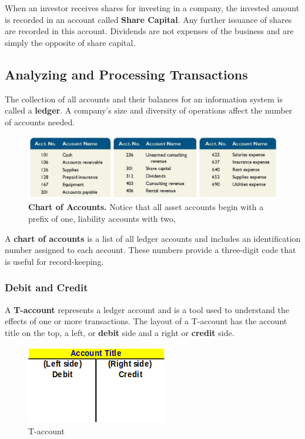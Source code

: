 \documentclass[../main.tex]{subfiles}
\begin{document}
	When an investor receives shares for investing in a company, 
	the invested amount is recorded in an account called \textbf{Share 
	Capital}.  Any further issuance of shares are recorded in this account. 
	Dividends are not expenses of the business and are simply the opposite of 
	share capital. 
	
	\subsection{Analyzing and Processing Transactions}
	
	The collection of all accounts and their balances for an information system 
	is called a \textbf{ledger}. A company's size and diversity of operations 
	affect the number of accounts needed.  
	
	\begin{figure}[ht]
		\centering
		\includegraphics[width=1\columnwidth]{images/c2/chart_of_accounts.png}
		\caption{\textbf{Chart of Accounts.} Notice that all asset accounts 
		begin with a 
		prefix of one, liability accounts with two, \etc}
	\end{figure}
	
	A \textbf{chart of accounts} is a 
	list of all ledger accounts and includes an identification number assigned 
	to each account. These numbers provide a three-digit code that is useful 
	for record-keeping. 
	
	\subsubsection{Debit and Credit}
	
	A \textbf{T-account} represents a ledger account and is a tool used to 
	understand the effects of one or more transactions. The layout of a 
	T-account has the account title on the top, a left, or \textbf{debit} side 
	and a right or \textbf{credit} side.
	
	\begin{figure}[ht]
		\centering
		\includegraphics[width=.5\columnwidth]{images/c2/t_account.png}
		\caption{T-account}
	\end{figure}
	
\end{document}
